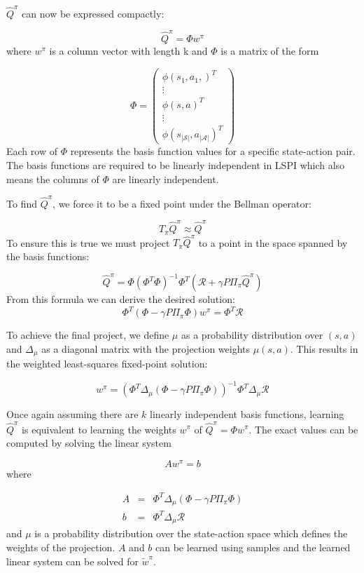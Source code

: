 $\hat{Q}^\pi$  can now be expressed compactly:

\[
    \hat{Q}^\pi = \Phi w^\pi
\]
where $w^\pi$ is a column vector with length k and $\Phi$ is a matrix of the form

\[
    \Phi = \begin{pmatrix}
        \phi(s_1,a_1,)^T \\ \vdots \\ \phi(s,a)^T \\ \vdots \\ \phi(s_{|\mathcal{S}|},a_{|\mathcal{A}|})^T
    \end{pmatrix}
\]
Each row of $\Phi$ represents the basis function values for a specific state-action pair. The basis functions are required to be linearly independent in LSPI which also means the columns of $\Phi$ are linearly independent.

To find $\hat{Q}^\pi$, we force it to be a fixed point under the Bellman operator:

\[
    T_\pi\hat{Q}^\pi \approx \hat{Q}^\pi
\]
To ensure this is true we must project $T_\pi\hat{Q}^\pi$ to a point in the space spanned by the basis functions:

\[
    \hat{Q}^\pi = \Phi(\Phi^T\Phi)^{-1}\Phi^T(\mathcal{R} + \gamma P\Pi_\pi\hat{Q}^\pi)
\]
From this formula we can derive the desired solution:
\[
    \Phi^T(\Phi - \gamma P\Pi_\pi\Phi)w^\pi = \Phi^T\mathcal{R}
\]

To achieve the final project, we define $\mu$ as a probability distribution over $(s,a)$ and $\Delta_\mu$ as a diagonal matrix with the projection weights $\mu(s,a)$. This results in the weighted least-squares fixed-point solution:

\[
    w^\pi = (\Phi^T\Delta_\mu(\Phi - \gamma P\Pi_\pi\Phi))^{-1}\Phi^T\Delta_\mu\mathcal{R}
\]

Once again assuming there are $k$ linearly independent basis functions, learning $\hat{Q}^\pi$ is equivalent to learning the weights $w^\pi$ of $\hat{Q}^\pi = \Phi w^\pi$. The exact values can be computed by solving the linear system

\[
    Aw^\pi = b
\]
where

\[
    \begin{array}{rcl}
        A &=& \Phi^T\Delta_\mu(\Phi - \gamma P\Pi_\pi\Phi) \\
        b &=& \Phi^T\Delta_\mu\mathcal{R}
    \end{array}
\]
and $\mu$ is a probability distribution over the state-action space which defines the weights of the projection. $A$ and $b$ can be learned using samples and the learned linear system can be solved for $\tilde{w}^\pi$. 

